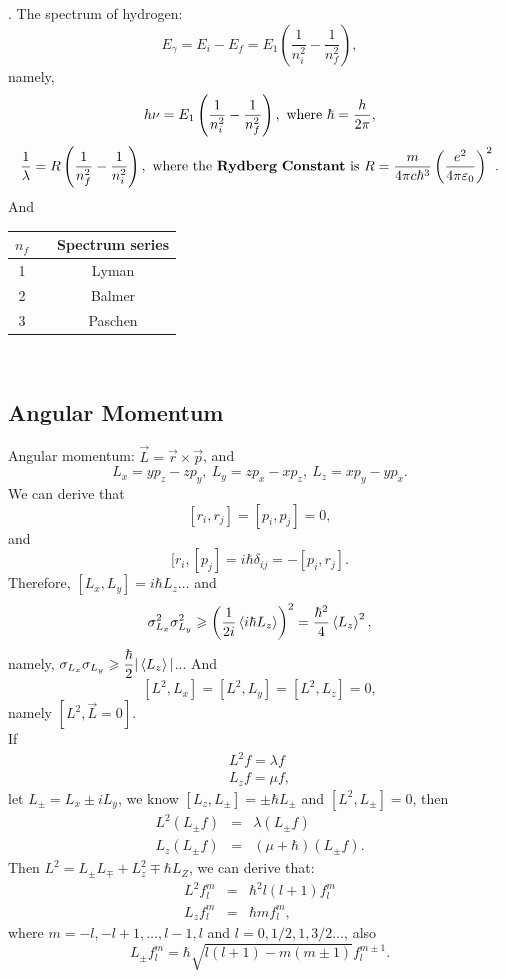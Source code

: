 \documentclass[12pt, 
]{article}
\begin{document}
. The spectrum of hydrogen:
\[
	E_\gamma=E_i-E_f=E_1\left(\frac{1}{n_i^2}-\frac{1}{n_f^2}\right),
\]
namely,
\[
	h\nu=E_1\left(\frac{1}{n_i^2}-\frac{1}{n_f^2}\right), ~{\rm where}~\hbar=\frac{h}{2\pi},
\]
\[
	\frac{1}{\lambda}=R\left(\frac{1}{n_f^2}-\frac{1}{n_i^2}\right),~{\rm where~the~{\bf Rydberg~Constant}~is}~R=\frac{m}{4\pi c\hbar^3}\left(\frac{e^2}{4\pi\varepsilon_0}\right)^2.
\]
And 
\begin{table}[h]
	\centering
	\begin{tabular}{ccc}
	\hline\hline
		$n_f$&&Spectrum series\\
	\hline
		1&&Lyman\\
		2&&Balmer\\
		3&&Paschen\\
	\hline\hline
	\end{tabular}
\end{table}
~\\

\subsection{Angular Momentum}
Angular momentum: $\vec{L}=\vec{r}\times\vec{p}$, and 
\[
	L_x=yp_z-zp_y,~L_y=zp_x-xp_z,~L_z=xp_y-yp_x.
\]
We can derive that
\[
	[r_i,r_j]=[p_i,p_j]=0,
\]
and \[
	[r_i, [p_j]=i\hbar\delta_{ij}=-[p_i,r_j].	
\]
Therefore, $[L_x, L_y]=i\hbar L_z$...
and
\[
	\sigma_{L_x}^2\sigma_{L_y}^2\geqslant\left(\frac{1}{2i}\braket{i\hbar L_z}\right)^2=\frac{\hbar^2}{4}\braket{L_z}^2,
\]
namely, $\sigma_{L_x}\sigma_{L_y}\geqslant\dfrac{\hbar}{2}|\braket{L_z}|$...
And \[
	[L^2,L_x]=[L^2,L_y]=[L^2,L_z]=0,
\]
namely $[L^2,\vec{L}=0]$.\\
If 
\begin{eqnarray*}
	L^2f=\lambda f\\
	L_zf=\mu f,
\end{eqnarray*}
let $L_\pm=L_x\pm iL_y$, we know $[L_z,L_\pm]=\pm\hbar L_\pm$ and $[L^2, L_\pm]=0$, then
\begin{eqnarray*}
	L^2(L_\pm f)&=&\lambda(L_\pm f)\\
	L_z(L_\pm f)&=&(\mu+\hbar)(L_\pm f).
\end{eqnarray*}
Then $L^2=L_\pm L_\mp +L_z^2\mp\hbar L_Z$, we can derive that:
\begin{eqnarray*}
	L^2f_l^m&=&\hbar^2l(l+1)f_l^m\\
	L_zf_l^m&=&\hbar mf_l^m,
\end{eqnarray*}
where $m=-l, -l+1,\dots,l-1,l$ and $l=0,1/2,1,3/2\dots$, also
\begin{equation}\label{eq:22}
	L_\pm f_l^m=\hbar\sqrt{l(l+1)-m(m\pm1)}f_l^{m\pm 1}.
\end{equation}~\\
\end{document}
